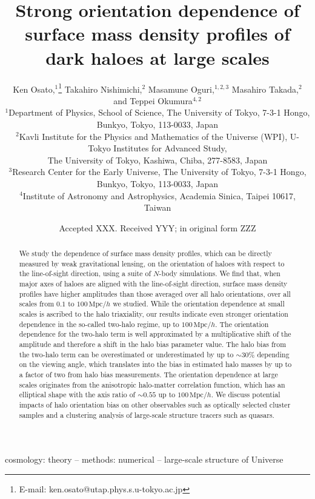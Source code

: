 \documentclass[a4paper,fleqn,usenatbib]{mnras}
\title[Orientation dependence of mass profiles]
{Strong orientation dependence of surface mass density profiles of
dark haloes at large scales}
\author[K. Osato et al.]{
Ken Osato,$^{1}$\thanks{E-mail: ken.osato@utap.phys.s.u-tokyo.ac.jp}
Takahiro Nishimichi,$^{2}$
Masamune Oguri,$^{1,2,3}$
Masahiro Takada,$^{2}$
\newauthor
and Teppei Okumura$^{4,2}$
\\
$^{1}$Department of Physics, School of Science, The University of Tokyo,
7-3-1 Hongo, Bunkyo, Tokyo, 113-0033, Japan\\
$^{2}$Kavli Institute for the Physics and Mathematics of the Universe (WPI),
U-Tokyo Institutes for Advanced Study,\\
The University of Tokyo, Kashiwa, Chiba, 277-8583, Japan\\
$^{3}$Research Center for the Early Universe, The University of Tokyo,
7-3-1 Hongo, Bunkyo, Tokyo, 113-0033, Japan\\
$^{4}$Institute of Astronomy and Astrophysics, Academia Sinica, Taipei 10617, Taiwan
}
\date{Accepted XXX. Received YYY; in original form ZZZ}
\newcommand{\Mpc}{\mathrm{Mpc}}
\begin{document}
\label{firstpage}
\pagerange{\pageref{firstpage}--\pageref{lastpage}}
\maketitle

\begin{abstract}
We study the dependence of surface mass density profiles, which can be
directly measured by weak gravitational lensing, on the orientation of
haloes with respect to the line-of-sight direction, using
a suite of $N$-body simulations. We find that, when major axes of haloes are
aligned with the line-of-sight direction, surface mass density
profiles have higher amplitudes than those averaged over all halo
orientations, over all scales from $0.1$ to $100\,\Mpc/h$ we studied.
While the orientation dependence at small scales is ascribed to
the halo triaxiality, our results indicate even stronger
orientation dependence in the so-called two-halo regime, up to $100\,\Mpc/h$.
The orientation dependence for the two-halo term is
well approximated by a multiplicative shift of the amplitude
and therefore a shift in the halo bias parameter value.
The halo bias from the two-halo term can be overestimated or underestimated
by up to $\sim 30\%$ depending on the
viewing angle, which translates into the bias in estimated halo masses
by up to a factor of two from halo bias measurements.
The orientation dependence at large scales originates
from the anisotropic halo-matter correlation function,
which has an elliptical shape with the axis
ratio of $\sim 0.55$ up to $100\,\Mpc/h$.
We discuss potential impacts of halo orientation bias
on other observables such as optically selected
cluster samples and a clustering analysis of large-scale structure
tracers such as quasars.
\end{abstract}

\begin{keywords}
cosmology: theory -- methods: numerical -- large-scale structure of Universe
\end{keywords}


\end{document}
